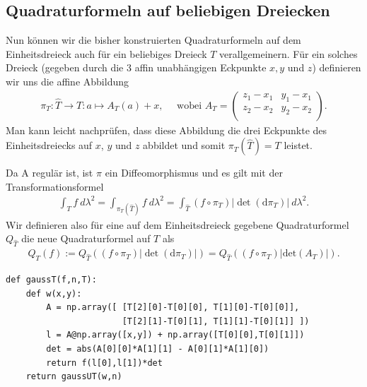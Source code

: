 \subsection{Quadraturformeln auf beliebigen Dreiecken}
Nun können wir die bisher konstruierten Quadraturformeln auf dem Einheitsdreieck auch für ein beliebiges Dreieck $T$ verallgemeinern. Für ein solches Dreieck (gegeben durch die 3 affin unabhängigen Eckpunkte $x,y$ und $z$) definieren wir uns die affine Abbildung
\begin{align*}
    \pi_{T}: \hat{T} \to T : a \mapsto A_{T}(a) + x, \text{~~~~wobei~} A_{T} = \left(\begin{array}{cc}                                
                z_{1}-x_{1} & y_{1}-x_{1}  \\
                z_{2}-x_{2} & y_{2}-x_{2}  \\
                \end{array}
                \right). 
\end{align*}
Man kann leicht nachprüfen, dass diese Abbildung die drei Eckpunkte des Einheitsdreiecks auf $x$, $y$ und $z$ abbildet und somit $\pi_{T}(\hat{T}) = T$ leistet. 

Da A regulär ist, ist $\pi$ ein Diffeomorphismus und es gilt mit der Transformationsformel
\begin{align*}
    \int_{T}f~d\lambda^{2} = \int_{\pi_{T}(\hat{T})}f~d\lambda^{2} = \int_{\hat{T}}(f\circ\pi_{T})|\det(\mathrm{d}\pi_{T})|~d\lambda^{2}.
\end{align*}
Wir definieren also für eine auf dem Einheitsdreieck gegebene Quadraturformel $Q_{\hat{T}}$ die neue Quadraturformel auf $T$ als
\begin{align*}
    Q_{T}(f) :=  Q_{\hat{T}}((f\circ\pi_{T})|\det(\mathrm{d}\pi_{T})|) = Q_{\hat{T}}((f\circ\pi_{T})|\mathrm{det}(A_{T})|).
\end{align*}

\lstset{language=Python}
\lstset{frame=lines}
\lstset{basicstyle=\footnotesize}
\begin{lstlisting}
def gaussT(f,n,T):
    def w(x,y):
        A = np.array([ [T[2][0]-T[0][0], T[1][0]-T[0][0]],
                       [T[2][1]-T[0][1], T[1][1]-T[0][1]] ])
        l = A@np.array([x,y]) + np.array([T[0][0],T[0][1]])
        det = abs(A[0][0]*A[1][1] - A[0][1]*A[1][0])
        return f(l[0],l[1])*det
    return gaussUT(w,n)
\end{lstlisting}

